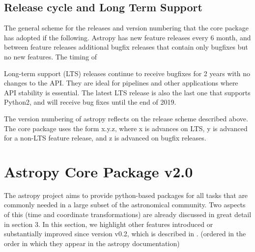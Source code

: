 \documentclass[modern]{aastex61}
\begin{document}
\subsection{Release cycle and Long Term Support}
%
\par The general scheme for the releases and version numbering that the core
package has adopted if the following. Astropy has new feature releases every
6 month, and between feature releases additional bugfix releases that
contain only bugfixes but no new features. The timing of
%
\par Long-term support (LTS) releases continue to receive bugfixes for 2
years with no changes to the API. They are ideal for pipelines and other
applications where API stability is essential. The latest LTS release is
also the last one that supports Python2, and will receive bug fixes until the
end of 2019.
%
\par The version numbering of astropy reflects on the release scheme
described above. The core package uses the form x.y.z, where x is advances
on LTS, y is advanced for a non-LTS feature release, and z is advanced on
bugfix releases.


\section{Astropy Core Package v2.0}
\label{sec:core}
The astropy project aims to provide python-based packages for all tasks that are commonly needed in a large subset of the astronomical community. Two aspects of this (time and coordinate transformations) are already discussed in great detail in section 3. In this section, we highlight other features introduced or substantially improved since version v0.2, which is described in \citet{2013A&A...558A..33A}.
(ordered in the order in which they appear in the astropy documentation)
\end{document}
